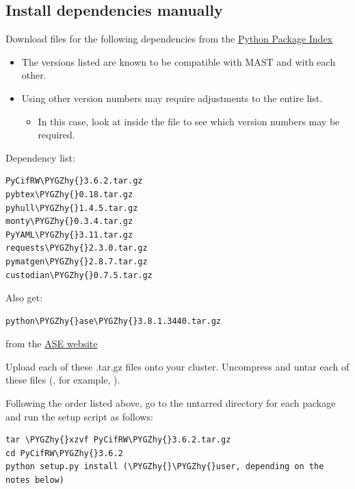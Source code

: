 \documentclass[letterpaper,10pt,english]{sphinxmanual}
\def\PYGZhy{\char`\-}
\begin{document}
\subsection{Install dependencies manually}
\label{1_0_installation:manual-installation}\label{1_0_installation:install-dependencies-manually}
Download  files for the following dependencies from the \href{https://pypi.python.org}{Python Package Index}
\begin{itemize}
\item {} 
The versions listed are known to be compatible with MAST and with each other.

\item {} 
Using other version numbers may require adjustments to the entire list.
\begin{itemize}
\item {} 
In this case, look at  inside the  file to see which version numbers may be required.

\end{itemize}

\end{itemize}

Dependency list:

\begin{Verbatim}[commandchars=\\\{\}]
PyCifRW\PYGZhy{}3.6.2.tar.gz
pybtex\PYGZhy{}0.18.tar.gz
pyhull\PYGZhy{}1.4.5.tar.gz
monty\PYGZhy{}0.3.4.tar.gz
PyYAML\PYGZhy{}3.11.tar.gz
requests\PYGZhy{}2.3.0.tar.gz
pymatgen\PYGZhy{}2.8.7.tar.gz
custodian\PYGZhy{}0.7.5.tar.gz
\end{Verbatim}

Also get:

\begin{Verbatim}[commandchars=\\\{\}]
python\PYGZhy{}ase\PYGZhy{}3.8.1.3440.tar.gz
\end{Verbatim}

from the \href{https://wiki.fysik.dtu.dk/ase/download.html}{ASE website}

Upload each of these .tar.gz files onto your cluster.
Uncompress and untar each of these files (, for example, ).

Following the order listed above, go to the untarred directory for each package and run the setup script as follows:

\begin{Verbatim}[commandchars=\\\{\}]
tar \PYGZhy{}xzvf PyCifRW\PYGZhy{}3.6.2.tar.gz
cd PyCifRW\PYGZhy{}3.6.2
python setup.py install (\PYGZhy{}\PYGZhy{}user, depending on the notes below)
\end{Verbatim}
\end{document}
